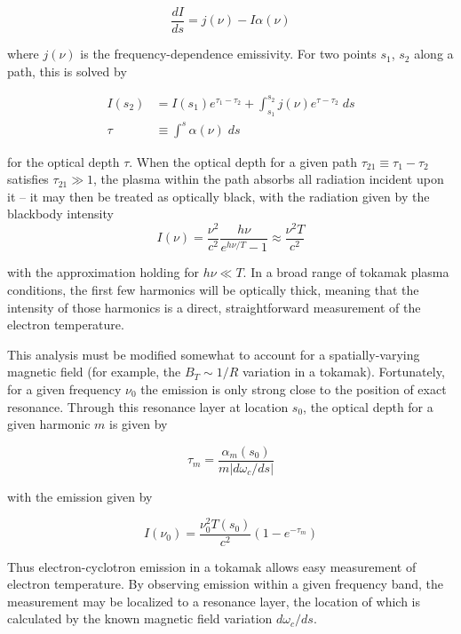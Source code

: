 \begin{equation}
 \frac{dI}{ds} = j(\nu) - I \alpha(\nu)
\end{equation}

\noindent where $j(\nu)$ is the frequency-dependence emissivity.  For two points $s_1$, $s_2$ along a path, this is solved by

\begin{equation}
 \begin{aligned}
  I(s_2) &= I(s_1) e^{\tau_1 - \tau_2} + \int_{s_1}^{s_2} j(\nu) e^{\tau - \tau_2} \;ds\\
  \tau &\equiv \int^s \alpha(\nu) \;ds
 \end{aligned}
\end{equation}

\noindent for the optical depth $\tau$.  When the optical depth for a given path $\tau_{21} \equiv \tau_1 - \tau_2$ satisfies $\tau_{21} \gg 1$, the plasma within the path absorbs all radiation incident upon it -- it may then be treated as optically black, with the radiation given by the blackbody intensity
\begin{equation}\label{eq:blackbody}
 I(\nu) = \frac{\nu^2}{c^2} \frac{h\nu}{e^{h\nu/T} - 1} \approx \frac{\nu^2 T}{c^2}
\end{equation}

\noindent with the approximation holding for $h\nu \ll T$.  In a broad range of tokamak plasma conditions, the first few harmonics will be optically thick, meaning that the intensity of those harmonics is a direct, straightforward measurement of the electron temperature.

This analysis must be modified somewhat to account for a spatially-varying magnetic field (for example, the $B_T \sim 1/R$ variation in a tokamak).  Fortunately, for a given frequency $\nu_0$ the emission is only strong close to the position of exact resonance.  Through this resonance layer at location $s_0$, the optical depth for a given harmonic $m$ is given by

\begin{equation}
 \tau_m = \frac{\alpha_m(s_0)}{m\left|d\omega_c/ds\right|}
\end{equation}

\noindent with the emission given by

\begin{equation}
 I(\nu_0) = \frac{\nu_0^2 T(s_0)}{c^2} \left( 1 - e^{-\tau_m} \right)
\end{equation}

\noindent Thus electron-cyclotron emission in a tokamak allows easy measurement of electron temperature.  By observing emission within a given frequency band, the measurement may be localized to a resonance layer, the location of which is calculated by the known magnetic field variation $d\omega_c/ds$.

